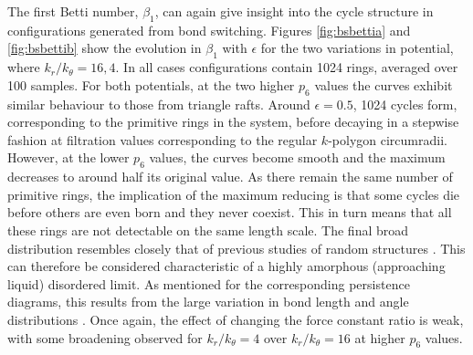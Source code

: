 The first Betti number, $\beta_1$, can again give insight into the cycle structure in configurations generated from bond switching.
Figures \ref{fig:bsbettia} and \ref{fig:bsbettib} show the evolution in $\beta_1$ with $\epsilon$ for the two variations in potential, where $k_r/k_\theta = 16,4$.
In all cases configurations contain 1024 rings, averaged over 100 samples. 
For both potentials, at the two higher $p_6$ values the curves exhibit similar behaviour to those from triangle rafts.
Around $\epsilon=0.5$, 1024 cycles form, corresponding to the primitive rings in the system, before decaying in a stepwise fashion at filtration values corresponding to the regular $k$\--polygon circumradii.
However, at the lower $p_6$ values, the curves become smooth and the maximum decreases to around half its original value.
As there remain the same number of primitive rings, the implication of the maximum reducing is that some cycles die before others are even born and they never coexist.
This in turn means that all these rings are not detectable on the same length scale.
The final broad distribution resembles closely that of previous studies of random structures \cite{Nakamura2015}.
This can therefore be considered characteristic of a highly amorphous (approaching liquid) disordered limit.
As mentioned for the corresponding persistence diagrams, this results from the large variation in bond length and angle distributions .
Once again, the effect of changing the force constant ratio is weak, with some broadening observed for $k_r/k_\theta=4$ over $k_r/k_\theta=16$ at higher $p_6$ values.

